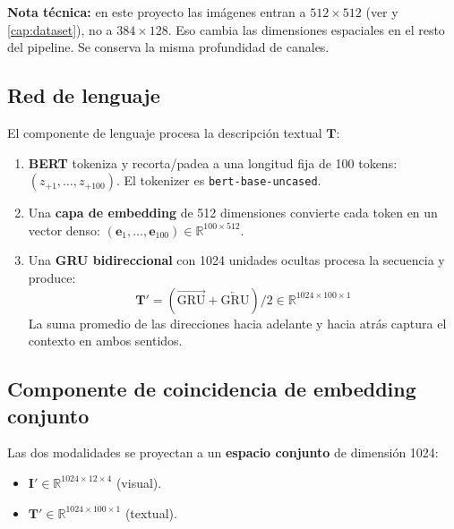 \noindent\textbf{Nota técnica:} en este proyecto las imágenes
entran a $512 \times 512$ (ver  y
\cref{cap:dataset}), no a $384 \times 128$. Eso cambia las
dimensiones espaciales en el resto del pipeline. Se conserva la
misma profundidad de canales.

\subsection{Red de lenguaje}

El componente de lenguaje procesa la descripción textual
$\mathbf{T}$:

\begin{enumerate}
  \item \textbf{BERT} tokeniza y recorta/padea a una longitud
        fija de 100 tokens: $(z_{+1}, \ldots, z_{+100})$.
        El tokenizer es \texttt{bert-base-uncased}.
  \item Una \textbf{capa de embedding} de 512 dimensiones convierte
        cada token en un vector denso:
        $(\mathbf{e}_1, \ldots, \mathbf{e}_{100}) \in
        \mathbb{R}^{100 \times 512}$.
  \item Una \textbf{GRU bidireccional} con 1024 unidades ocultas
        procesa la secuencia y produce:
        \begin{equation}
          \mathbf{T}' = (\overrightarrow{\text{GRU}} +
                          \overleftarrow{\text{GRU}}) / 2
          \in \mathbb{R}^{1024 \times 100 \times 1}
          \label{eq:bigru}
        \end{equation}
        La suma promedio de las direcciones hacia adelante y hacia
        atrás captura el contexto en ambos sentidos.
\end{enumerate}

\subsection{Componente de coincidencia de embedding conjunto}

Las dos modalidades se proyectan a un \textbf{espacio conjunto} de
dimensión 1024:

\begin{itemize}
  \item $\mathbf{I}' \in \mathbb{R}^{1024 \times 12 \times 4}$
        (visual).
  \item $\mathbf{T}' \in \mathbb{R}^{1024 \times 100 \times 1}$
        (textual).
\end{itemize}

